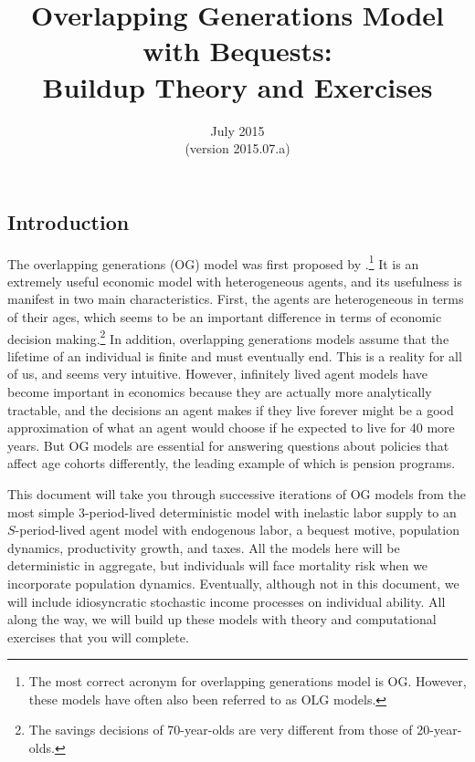 \documentclass[letterpaper,12pt]{article}
\theoremstyle{definition}
\numberwithin{equation}{section}
\numberwithin{exercise}{section}
\begin{document}
\title{Overlapping Generations Model with Bequests: \\
       Buildup Theory and Exercises}
\date{July 2015\\
{\footnotesize{(version 2015.07.a)}}}
\author{}
\maketitle

\begin{spacing}{1.5}


\section{Introduction}\label{SecIntro}

   The overlapping generations (OG) model was first proposed by \citet{Samuelson:1958}.\footnote{The most correct acronym for overlapping generations model is OG. However, these models have often also been referred to as OLG models.} It is an extremely useful economic model with heterogeneous agents, and its usefulness is manifest in two main characteristics. First, the agents are heterogeneous in terms of their ages, which seems to be an important difference in terms of economic decision making.\footnote{The savings decisions of 70-year-olds are very different from those of 20-year-olds.} In addition, overlapping generations models assume that the lifetime of an individual is finite and must eventually end. This is a reality for all of us, and seems very intuitive. However, infinitely lived agent models have become important in economics because they are actually more analytically tractable, and the decisions an agent makes if they live forever might be a good approximation of what an agent would choose if he expected to live for 40 more years. But OG models are essential for answering questions about policies that affect age cohorts differently, the leading example of which is pension programs.

   This document will take you through successive iterations of OG models from the most simple 3-period-lived deterministic model with inelastic labor supply to an $S$-period-lived agent model with endogenous labor, a bequest motive, population dynamics, productivity growth, and taxes. All the models here will be deterministic in aggregate, but individuals will face mortality risk when we incorporate population dynamics. Eventually, although not in this document, we will include idiosyncratic stochastic income processes on individual ability. All along the way, we will build up these models with theory and computational exercises that you will complete.



\end{spacing}
\end{document}
